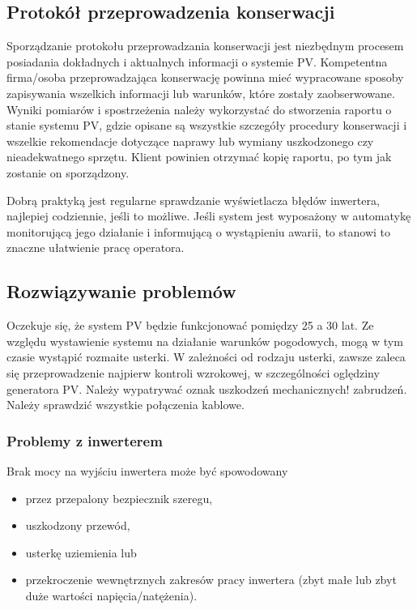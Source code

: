\documentclass[12pt,a4paper]{article}
\begin{document}
\subsection{Protokół przeprowadzenia konserwacji}
  

Sporządzanie protokołu przeprowadzania konserwacji jest niezbędnym 
procesem posiadania dokładnych i aktualnych informacji o systemie PV. 
Kompetentna firma/osoba przeprowadzająca konserwację powinna mieć 
wypracowane sposoby zapisywania wszelkich informacji lub warunków, które 
zostały zaobserwowane. Wyniki pomiarów i spostrzeżenia należy 
wykorzystać do stworzenia raportu o stanie systemu PV, gdzie opisane są 
wszystkie szczegóły procedury konserwacji i wszelkie rekomendacje 
dotyczące naprawy lub wymiany uszkodzonego czy nieadekwatnego sprzętu. 
Klient powinien otrzymać kopię raportu, po tym jak zostanie on 
sporządzony. 

 

Dobrą praktyką jest regularne sprawdzanie wyświetlacza błędów inwertera, 
najlepiej codziennie, jeśli to możliwe. Jeśli system jest wyposażony w 
automatykę monitorującą jego działanie i informującą o wystąpieniu 
awarii, to stanowi to znaczne ułatwienie pracę operatora. 

 

\subsection{Rozwiązywanie problemów}
  

Oczekuje się, że system PV będzie funkcjonować pomiędzy 25 a 30 lat. Ze 
względu wystawienie systemu na działanie warunków pogodowych, mogą w tym 
czasie wystąpić rozmaite usterki. W zależności od rodzaju usterki, 
zawsze zaleca się przeprowadzenie najpierw kontroli wzrokowej, w 
szczególności oględziny generatora PV. Należy wypatrywać oznak uszkodzeń 
mechanicznych! zabrudzeń. Należy sprawdzić wszystkie połączenia kablowe. 


 

\subsubsection{Problemy z inwerterem}
 

Brak mocy na wyjściu inwertera może być spowodowany 

\begin{itemize}
\item przez przepalony bezpiecznik szeregu, 
\item uszkodzony przewód, 
\item usterkę uziemienia lub 
\item przekroczenie wewnętrznych zakresów pracy inwertera (zbyt małe lub 
zbyt duże wartości napięcia/natężenia). 
\end{itemize}
\end{document}
